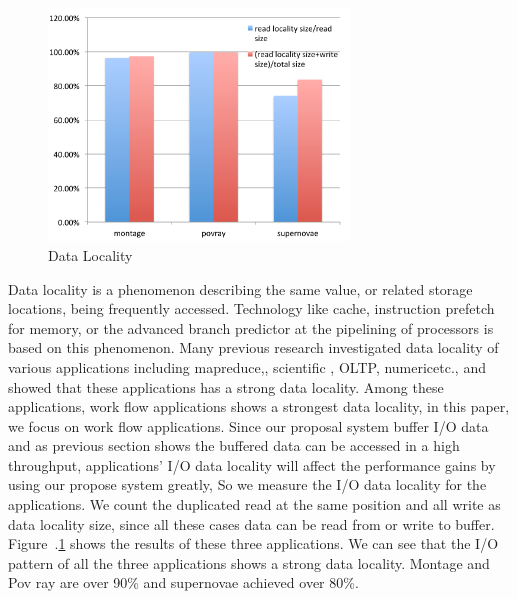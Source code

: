 \begin{figure}
\centering
\includegraphics[width=8cm]{img/data_locality.pdf}
\caption{Data Locality}
\label{background:data locality}
\end{figure}
Data locality is a phenomenon describing the same value, or related storage locations, being
frequently accessed.
Technology like cache, instruction prefetch for memory, or the advanced branch predictor
at the pipelining of processors is based on this phenomenon.
Many previous research investigated data locality of various
applications including 
mapreduce,\cite{Investigation_of_Data_Locality_in_MapReduce}, scientific
\cite{Intrinsic_data_locality_of_modern_scientific_workloads},
OLTP\cite{Data_locality_characterization_of_OLTP},
numeric\cite{Analyzing_data_locality_in_numeric_applications}etc., and showed that these
applications has a strong data locality.
Among these applications, work flow applications shows a strongest data locality, in this paper, we
focus on work flow applications.
Since our proposal
system buffer I/O data and as previous section shows the buffered data can be accessed in a high throughput, applications' I/O data locality will affect the performance gains by
using our propose system greatly, So we measure the I/O data locality for the applications.
We count the duplicated read at the same position and all write as data locality size, since all
these cases data can be read from or write to buffer.
Figure~.\ref{background:data locality} shows the results of these three applications.
We can see
that the I/O pattern of all the three applications shows a strong data locality. Montage and Pov ray
are over 90\% and supernovae achieved over 80\%.
